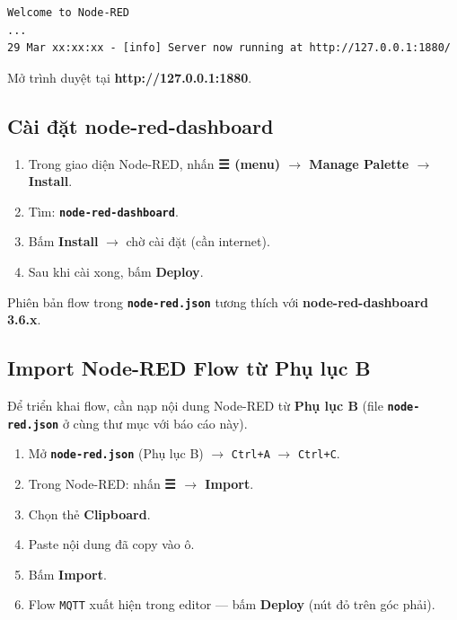 \documentclass[13pt,a4paper]{article}
\newcommand{\code}[1]{\texttt{#1}}
\newcommand{\file}[1]{\textbf{\texttt{#1}}}
\begin{document}
\begin{lstlisting}[style=flowcode, caption={Output khi khởi động Node-RED}, label={lst:nrlog}]
Welcome to Node-RED
...
29 Mar xx:xx:xx - [info] Server now running at http://127.0.0.1:1880/
\end{lstlisting}

Mở trình duyệt tại \textbf{http://127.0.0.1:1880}.

\subsection{Cài đặt node-red-dashboard}
\label{sec:dashboardinstall}

\begin{enumerate}[label=\arabic*., leftmargin=1.5cm]
    \item Trong giao diện Node-RED, nhấn \textbf{☰ (menu) $\rightarrow$ Manage Palette $\rightarrow$ Install}.
    \item Tìm: \textbf{\code{node-red-dashboard}}.
    \item Bấm \textbf{Install} $\rightarrow$ chờ cài đặt (cần internet).
    \item Sau khi cài xong, bấm \textbf{Deploy}.
\end{enumerate}

Phiên bản flow trong \file{node-red.json} tương thích với \textbf{node-red-dashboard 3.6.x}.

\subsection{Import Node-RED Flow từ Phụ lục B}
\label{sec:import}

Để triển khai flow, cần nạp nội dung Node-RED từ \textbf{Phụ lục B} (file \file{node-red.json} ở cùng thư mục với báo cáo này).

\begin{enumerate}[label=\arabic*., leftmargin=1.5cm]
    \item Mở \file{node-red.json} (Phụ lục B) $\rightarrow$ \code{Ctrl+A} $\rightarrow$ \code{Ctrl+C}.
    \item Trong Node-RED: nhấn \textbf{☰ $\rightarrow$ Import}.
    \item Chọn thẻ \textbf{Clipboard}.
    \item Paste nội dung đã copy vào ô.
    \item Bấm \textbf{Import}.
    \item Flow \code{MQTT} xuất hiện trong editor --- bấm \textbf{Deploy} (nút đỏ trên góc phải).
\end{enumerate}
\end{document}
